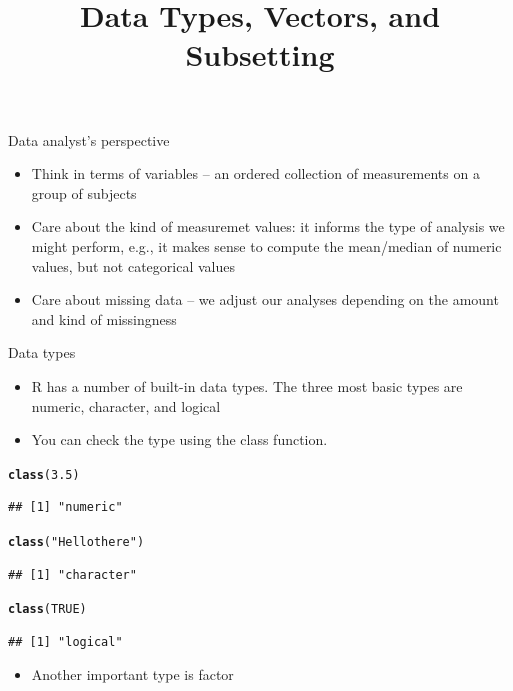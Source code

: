 \documentclass{beamer}\usepackage[]{graphicx}\usepackage[]{color}
\makeatletter
\newcommand{\hlnum}[1]{\textcolor[rgb]{0.686,0.059,0.569}{#1}}%
\newcommand{\hlstr}[1]{\textcolor[rgb]{0.192,0.494,0.8}{#1}}%
\newcommand{\hlstd}[1]{\textcolor[rgb]{0.345,0.345,0.345}{#1}}%
\newcommand{\hlkwd}[1]{\textcolor[rgb]{0.737,0.353,0.396}{\textbf{#1}}}%
\newenvironment{kframe}{%
 \def\at@end@of@kframe{}%
 \ifinner\ifhmode%
  \def\at@end@of@kframe{\end{minipage}}%
  \begin{minipage}{\columnwidth}%
 \fi\fi%
 \def\FrameCommand##1{\hskip\@totalleftmargin \hskip-\fboxsep
 \colorbox{shadecolor}{##1}\hskip-\fboxsep
     \hskip-\linewidth \hskip-\@totalleftmargin \hskip\columnwidth}%
 \MakeFramed {\advance\hsize-\width
   \@totalleftmargin\z@ \linewidth\hsize
   \@setminipage}}%
 {\par\unskip\endMakeFramed%
 \at@end@of@kframe}
\newenvironment{knitrout}{}{} %
\renewenvironment{knitrout}{\begin{singlespace}}{\end{singlespace}}
\theoremstyle{mystyle}
\makeatother
\begin{document}

\title{
Data Types, Vectors, and Subsetting
}
\author{
}
\date{}

\begin{frame}[fragile]
\titlepage
\end{frame}


\begin{frame}{Data analyst's perspective}
\begin{itemize}
\item Think in terms of variables – an ordered collection of measurements on a group of subjects
\item Care about the kind of measuremet values: it informs the type of analysis we might perform, e.g., it makes sense to compute the mean/median of numeric values, but not categorical values
\item Care about missing data – we adjust our analyses depending on the amount and kind of missingness
\end{itemize}
\end{frame}

\begin{frame}[fragile]{Data types}
\begin{itemize}
\item R has a number of built-in data types.  The three most basic types are numeric, character, and logical 
\item You can check the type using the class function.
\end{itemize}
\begin{singlespace}
\begin{knitrout}
\color{fgcolor}\begin{kframe}
\begin{alltt}
\hlkwd{class}\hlstd{(}\hlnum{3.5}\hlstd{)}
\end{alltt}
\begin{verbatim}
## [1] "numeric"
\end{verbatim}
\begin{alltt}
\hlkwd{class}\hlstd{(}\hlstr{"Hello there"}\hlstd{)}
\end{alltt}
\begin{verbatim}
## [1] "character"
\end{verbatim}
\begin{alltt}
\hlkwd{class}\hlstd{(}\hlnum{TRUE}\hlstd{)}
\end{alltt}
\begin{verbatim}
## [1] "logical"
\end{verbatim}
\end{kframe}
\end{knitrout}
\end{singlespace}
\begin{itemize}
\item Another important type is factor
\end{itemize}
\end{frame}
\end{document}
